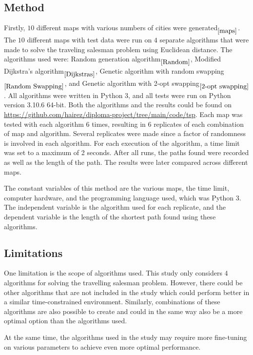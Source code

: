 \documentclass{article}
\begin{document}
\subsection{Method}\label{Method}
Firstly, $10$ different maps with various numbers of cities were generated$_{\ref{maps}}$. The $10$ different maps with test data were run on $4$ separate algorithms that were made to solve the traveling salesman problem using Euclidean distance. The algorithms used were: Random generation algorithm$_{\ref{Random}}$, Modified Dijkstra's algorithm$_{\ref{Dijkstras}}$, Genetic algorithm with random swapping$_{\ref{Random Swapping}}$, and Genetic algorithm with 2-opt swapping$_{\ref{2-opt swapping}}$. All algorithms were written in Python 3, and all tests were run on Python version 3.10.6 64-bit. Both the algorithms and the results could be found on \href{https://github.com/hairez/diploma-project/tree/main/code/tsp}{https://github.com/hairez/diploma-project/tree/main/code/tsp}. Each map was tested with each algorithm $6$ times, resulting in $6$ replicates of each combination of map and algorithm. Several replicates were made since a factor of randomness is involved in each algorithm. For each execution of the algorithm, a time limit was set to a maximum of 2 seconds. After all runs, the paths found were recorded as well as the length of the path. The results were later compared across different maps.

\noindent
The constant variables of this method are the various maps, the time limit, computer hardware, and the programming language used, which was Python 3. The independent variable is the algorithm used for each replicate, and the dependent variable is the length of the shortest path found using these algorithms.


\subsection{Limitations}\label{Limitations}
One limitation is the scope of algorithms used. This study only considers $4$ algorithms for solving the travelling salesman problem. However, there could be other algorithms that are not included in the study which could perform better in a similar time-constrained environment. Similarly, combinations of these algorithms are also possible to create and could in the same way also be a more optimal option than the algorithms used. 

\noindent
At the same time, the algorithms used in the study may require more fine-tuning on various parameters to achieve even more optimal performance. 
\end{document}
